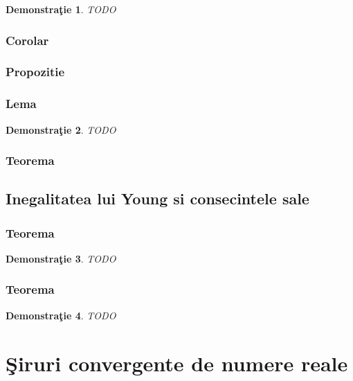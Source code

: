 \documentclass[a4paper,12pt,oneside]{report}
\newtheorem{demonstration}{Demonstra\c tie}
\begin{document}
\begin{demonstration}
TODO	
\end{demonstration}


\subsection{Corolar}

\subsection{Propozitie}

\subsection{Lema}

\begin{demonstration}
TODO	
\end{demonstration}


\subsection{Teorema}


\section{Inegalitatea lui Young si consecintele sale}

\subsection{Teorema}


\begin{demonstration}
TODO	
\end{demonstration}

\subsection{Teorema}

\begin{demonstration}
TODO	
\end{demonstration}



%
%
%
%


\chapter{\c Siruri convergente de numere reale}
\end{document}
